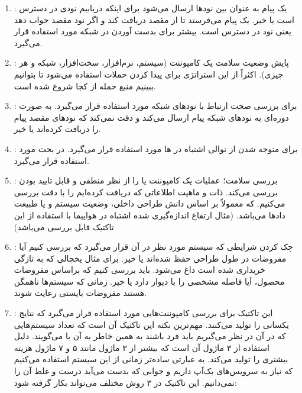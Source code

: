 \begin{enumerate}
    \item {}: یک پیام به عنوان  بین
    نود‌ها ارسال می‌شود برای اینکه دریابیم نودی در دسترس است یا خیر. یک پیام
    می‌فرستد تا  از مقصد دریافت کند و اگر نود مقصد جواب دهد یعنی نود در
    دسترس است. بیشتر برای بدست آوردن  در شبکه مورد استفاده قرار
    می‌گیرد.
    \item {}: پایش وضعیت سلامت یک کامپوننت (سیستم، نرم‌افزار،
    سخت‌افزار، شبکه و هر چیزی). اکثراً از این استراتژی برای پیدا کردن حملات
     استفاده می‌شود تا بتوانیم ببینیم منبع حمله از کجا شروع شده است.
    \item {}: برای بررسی صحت ارتباط با نود‌های شبکه مورد استفاده
    قرار می‌گیرد. به صورت دوره‌ای به نود‌های شبکه پیام ارسال می‌کند و دقت
    نمی‌کند که نود‌های مقصد پیام را دریافت کرده‌اند یا خیر.
    \item {}: برای متوجه شدن از توالی اشتباه در ها مورد
    استفاده قرار می‌گیرد. در بحث  مورد استفاده
    قرار می‌گیرد.
    \item {}: بررسی سلامت؛ عملیات یک کامپوننت یا  را
    از نظر منطقی و قابل تایید بودن بررسی می‌کند. ذات و ماهیت اطلاعاتی که دریافت
    کرده‌ایم را با دقت بررسی می‌کنیم. که معمولاً بر اساس دانش طراحی داخلی، وضعیت
    سیستم و یا طبیعت داد‌ها می‌باشد. (مثال ارتفاع اندازه‌گیری شده اشتباه در
    هواپیما با استفاده از این تاکتیک قابل بررسی می‌باشد)
    \item {}: چک کردن شرایطی که سیستم مورد نظر در آن قرار
    می‌گیرد که بررسی کنیم آیا مفروضات در طول طراحی حفظ شده‌اند یا خیر. برای مثال
    یخچالی که به تازگی خریداری شده است داغ می‌شود. باید بررسی کنیم که براساس
    مفروضات محصول، آیا فاصله مشخصی را با دیوار دارد یا خیر. زمانی که سیستم‌ها
    ناهمگن هستند مفروضات بایستی رعایت شوند.
    \item {}: این تاکتیک برای بررسی کامپوننت‌هایی مورد استفاده قرار
    می‌گیرد که نتایج یکسانی را تولید می‌کنند. مهم‌ترین نکته این تاکتیک آن است که
    تعداد سیستم‌هایی که در آن در نظر می‌گیریم باید فرد باشند به همین خاطر به آن
     یا  می‌گویند. دلیل استفاده از ۳ ماژول
    آن است که بیشتر از ۳ ماژول مانند ۵ و ۷ ماژول هزینه بیشتری را تولید می‌کند.
    به عبارتی ساده‌تر زمانی از این سیستم استفاده می‌کنیم که نیاز به سرویس‌های
    بک‌آپ داریم و جوابی که بدست می‌آید درست و غلط آن را نمی‌دانیم. این تاکتیک در
    ۳ روش مختلف می‌تواند بکار گرفته شود:

\end{enumerate}
